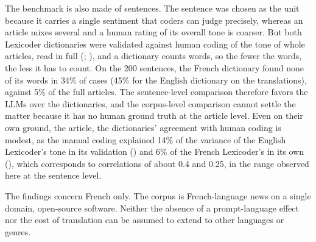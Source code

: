 \documentclass[
  man,
  floatsintext,
  longtable,
  nolmodern,
  notxfonts,
  notimes,
  colorlinks=true,linkcolor=blue,citecolor=blue,urlcolor=blue]{apa7}
\begin{document}
The benchmark is also made of sentences. The sentence was chosen as the
unit because it carries a single sentiment that coders can judge
precisely, whereas an article mixes several and a human rating of its
overall tone is coarser. But both Lexicoder dictionaries were validated
against human coding of the tone of whole articles, read in full
(;
), and a
dictionary counts words, so the fewer the words, the less it has to
count. On the 200 sentences, the French dictionary found none of its
words in 34\% of cases (45\% for the English dictionary on the
translations), against 5\% of the full articles. The sentence-level
comparison therefore favors the LLMs over the dictionaries, and the
corpus-level comparison cannot settle the matter because it has no human
ground truth at the article level. Even on their own ground, the
article, the dictionaries' agreement with human coding is modest, as the
manual coding explained 14\% of the variance of the English Lexicoder's
tone in its validation () and 6\% of the French Lexicoder's in its own
(), which corresponds
to correlations of about 0.4 and 0.25, in the range observed here at the
sentence level.

The findings concern French only. The corpus is French-language news on
a single domain, open-source software. Neither the absence of a
prompt-language effect nor the cost of translation can be assumed to
extend to other languages or genres.
\end{document}
